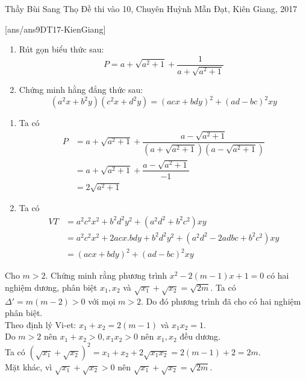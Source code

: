\begin{name}
{Thầy  Bùi Sang Thọ}
{Đề thi vào 10, Chuyên Huỳnh Mẫn Đạt, Kiên Giang, 2017}
\end{name}
\setcounter{ex}{0}
[ans/ans9DT17-KienGiang]
\begin{ex}%
    \hfill
    \begin{enumerate}
        \item Rút gọn biểu thức sau: $$ P=a+\sqrt{a^2+1}+\dfrac{1}{a+\sqrt{a^2+1}} $$
        \item Chứng minh hằng đẳng thức sau:$$ \left(a^2x+b^2y\right)\left(c^2x+d^2y\right)=\left(acx+bdy\right)^2+(ad-bc)^2xy $$
    \end{enumerate}
\loigiai
    {
    \begin{enumerate}
        \item Ta có
\begin{align*}
P&=a+\sqrt{a^2+1}+\dfrac{a-\sqrt{a^2+1}}{\left(a+\sqrt{a^2+1}\right)\left(a-\sqrt{a^2+1}\right)}\\ 
&=a+\sqrt{a^2+1}+\dfrac{a-\sqrt{a^2+1}}{-1}\\
&=2\sqrt{a^2+1}
\end{align*}
        \item Ta có 
\begin{align*}
VT&=a^2c^2x^2+b^2d^2y^2+\left(a^2d^2+b^2c^2\right)xy\\ 
&=a^2c^2x^2+2acx.bdy+b^2d^2y^2+\left(a^2d^2-2adbc+b^2c^2\right)xy\\
&=\left(acx+bdy\right)^2+(ad-bc)^2xy
\end{align*}
    \end{enumerate}
    }
\end{ex}

\begin{ex}%
Cho $m>2$. Chứng minh rằng phương trình $x^2-2(m-1)x+1=0$ có hai nghiệm dương, phân biệt $x_1, x_2$ và $\sqrt{x_1}+\sqrt{x_2}=\sqrt{2m}$.
\loigiai
    {Ta có $\Delta'=m(m-2)>0$ với mọi $m>2$. Do đó phương trình đã cho có hai nghiệm phân biệt.\\
Theo định lý Vi-et: $x_1+x_2=2(m-1)$ và $x_1x_2=1$.\\
Do $m>2$ nên $x_1+x_2>0, x_1x_2>0$ nên $x_1, x_2$ đều dương.\\
Ta có $\left(\sqrt{x_1}+\sqrt{x_2}\right)^2=x_1+x_2+2\sqrt{x_1x_2}=2(m-1)+2=2m$.\\
 Mặt khác, vì $\sqrt{x_1}+\sqrt{x_2}>0$ nên $\sqrt{x_1}+\sqrt{x_2}=\sqrt{2m}$.   
    }
\end{ex}

